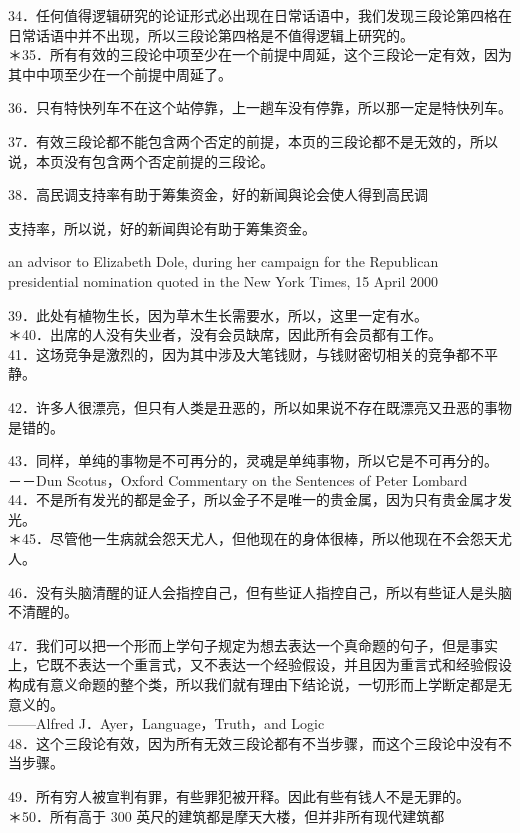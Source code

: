 34．任何值得逻辑研究的论证形式必出现在日常话语中，我们发现三段论第四格在日常话语中并不出现，所以三段论第四格是不值得逻辑上研究的。\\
＊35．所有有效的三段论中项至少在一个前提中周延，这个三段论一定有效，因为其中中项至少在一个前提中周延了。

36．只有特快列车不在这个站停靠，上一趟车没有停靠，所以那一定是特快列车。

37．有效三段论都不能包含两个否定的前提，本页的三段论都不是无效的，所以说，本页没有包含两个否定前提的三段论。

38．高民调支持率有助于筹集资金，好的新闻與论会使人得到高民调

支持率，所以说，好的新闻舆论有助于筹集资金。

\begin{displayquote}
an advisor to Elizabeth Dole, during her campaign for the Republican presidential nomination quoted in the New York Times, 15 April 2000
\end{displayquote}

39．此处有植物生长，因为草木生长需要水，所以，这里一定有水。\\
＊40．出席的人没有失业者，没有会员缺席，因此所有会员都有工作。\\
41．这场竞争是激烈的，因为其中涉及大笔钱财，与钱财密切相关的竞争都不平静。

42．许多人很漂亮，但只有人类是丑恶的，所以如果说不存在既漂亮又丑恶的事物是错的。

43．同样，单纯的事物是不可再分的，灵魂是单纯事物，所以它是不可再分的。\\
－－Dun Scotus，Oxford Commentary on the Sentences of Peter Lombard\\
44．不是所有发光的都是金子，所以金子不是唯一的贵金属，因为只有贵金属才发光。\\
＊45．尽管他一生病就会怨天尤人，但他现在的身体很棒，所以他现在不会怨天尤人。

46．没有头脑清醒的证人会指控自己，但有些证人指控自己，所以有些证人是头脑不清醒的。

47．我们可以把一个形而上学句子规定为想去表达一个真命题的句子，但是事实上，它既不表达一个重言式，又不表达一个经验假设，并且因为重言式和经验假设构成有意义命题的整个类，所以我们就有理由下结论说，一切形而上学断定都是无意义的。\\
——Alfred J．Ayer，Language，Truth，and Logic\\
48．这个三段论有效，因为所有无效三段论都有不当步骤，而这个三段论中没有不当步骤。

49．所有穷人被宣判有罪，有些罪犯被开释。因此有些有钱人不是无罪的。\\
＊50．所有高于 300 英尺的建筑都是摩天大楼，但并非所有现代建筑都

